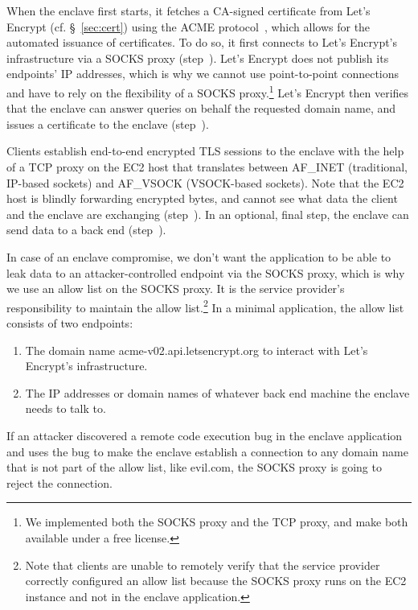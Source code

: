 When the enclave first starts, it fetches a CA-signed certificate from Let's
Encrypt (cf. \S~\ref{sec:cert}) using the ACME protocol~\cite{acme-protocol},
which allows for the automated issuance of certificates.  To do so, it first
connects to Let's Encrypt's infrastructure via a SOCKS proxy (step~).
Let's Encrypt does not publish its endpoints' IP addresses, which is why we
cannot use point-to-point connections and have to rely on the flexibility of a
SOCKS proxy.\footnote{We implemented both the SOCKS proxy and the TCP proxy, and
make both available under a free license.}  Let's Encrypt then verifies that the
enclave can answer queries on behalf the requested domain name, and issues a
certificate to the enclave (step~).

Clients establish end-to-end encrypted TLS sessions to the enclave with the help
of a TCP proxy on the EC2 host that translates between AF\_INET (traditional,
IP-based sockets) and AF\_VSOCK (VSOCK-based sockets).  Note that the EC2 host
is blindly forwarding encrypted bytes, and cannot see what data the client and
the enclave are exchanging (step~).  In an optional, final step, the
enclave can send data to a back end (step~).

In case of an enclave compromise, we don't want the application to be able to
leak data to an attacker-controlled endpoint via the SOCKS proxy, which is why
we use an allow list on the SOCKS proxy.  It is the service provider's
responsibility to maintain the allow list.\footnote{Note that clients are unable
to remotely verify that the service provider correctly configured an allow list
because the SOCKS proxy runs on the EC2 instance and not in the enclave
application.}  In a minimal application, the allow list consists of two
endpoints:

\begin{enumerate}
    \item The domain name acme-v02.api.letsencrypt.org to interact with Let's
      Encrypt's infrastructure.
    \item The IP addresses or domain names of whatever back end machine the
      enclave needs to talk to.
\end{enumerate}

If an attacker discovered a remote code execution bug in the enclave application
and uses the bug to make the enclave establish a connection to any domain name
that is not part of the allow list, like evil.com, the SOCKS proxy is going to
reject the connection.

